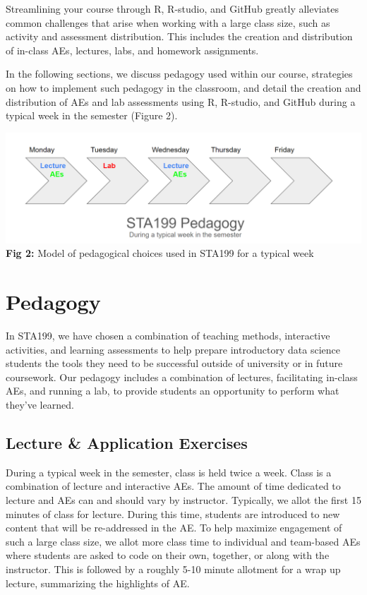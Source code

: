 \documentclass[
  12pt]{article}
\begin{document}
Streamlining your course through R, R-studio, and GitHub greatly
alleviates common challenges that arise when working with a large class
size, such as activity and assessment distribution. This includes the
creation and distribution of in-class AEs, lectures, labs, and homework
assignments.

In the following sections, we discuss pedagogy used within our course,
strategies on how to implement such pedagogy in the classroom, and
detail the creation and distribution of AEs and lab assessments using R,
R-studio, and GitHub during a typical week in the semester (Figure 2).

\includegraphics{images/pedagogy.png} \textbf{Fig 2:} Model of
pedagogical choices used in STA199 for a typical week

\hypertarget{sec-ped}{%
\section{Pedagogy}\label{sec-ped}}

In STA199, we have chosen a combination of teaching methods, interactive
activities, and learning assessments to help prepare introductory data
science students the tools they need to be successful outside of
university or in future coursework. Our pedagogy includes a combination
of lectures, facilitating in-class AEs, and running a lab, to provide
students an opportunity to perform what they've learned.

\hypertarget{lecture-application-exercises}{%
\subsection{Lecture \& Application
Exercises}\label{lecture-application-exercises}}

During a typical week in the semester, class is held twice a week. Class
is a combination of lecture and interactive AEs. The amount of time
dedicated to lecture and AEs can and should vary by instructor.
Typically, we allot the first 15 minutes of class for lecture. During
this time, students are introduced to new content that will be
re-addressed in the AE. To help maximize engagement of such a large
class size, we allot more class time to individual and team-based AEs
where students are asked to code on their own, together, or along with
the instructor. This is followed by a roughly 5-10 minute allotment for
a wrap up lecture, summarizing the highlights of AE.
\end{document}
